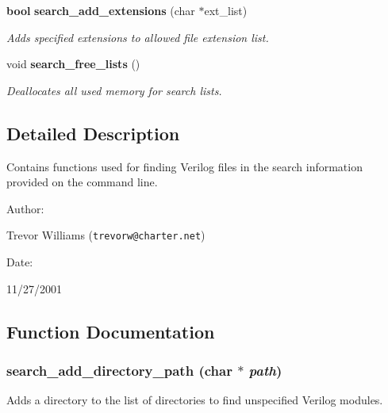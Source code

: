 \begin{CompactItemize}
{\bf bool} {\bf search\_\-add\_\-extensions} (char $\ast$ext\_\-list)
\begin{CompactList}\small\item\em Adds specified extensions to allowed file extension list.\item\end{CompactList}\item 
void {\bf search\_\-free\_\-lists} ()
\begin{CompactList}\small\item\em Deallocates all used memory for search lists.\item\end{CompactList}\end{CompactItemize}


\subsection{Detailed Description}
Contains functions used for finding Verilog files in the search information provided on the command line.



\begin{Desc}
\item[Author: ]\par
Trevor Williams ({\tt trevorw@charter.net}) \end{Desc}
\begin{Desc}
\item[Date: ]\par
11/27/2001\end{Desc}


\subsection{Function Documentation}
\subsubsection{ search\_\-add\_\-directory\_\-path (char $\ast$ {\em path})}\label{search_8h_a2}


Adds a directory to the list of directories to find unspecified Verilog modules.

